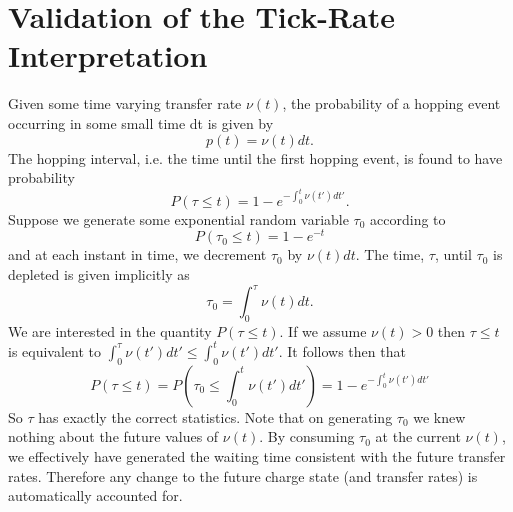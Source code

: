 \documentclass[11pt]{article}
\newcommand{\bibfile}{refs.bib}
\newcommand{\kt}{k_B T}
\begin{document}
\clearpage
\appendix

\section{Validation of the Tick-Rate Interpretation}
\label{app:tickrate}

Given some time varying transfer rate $\nu(t)$, the probability of a hopping event occurring in some small time dt is given by 
\begin{equation}
p(t) = \nu(t) dt.
\end{equation}
The hopping interval, i.e. the time until the first hopping event, is found to have probability
\begin{equation}
P(\tau \leq t) = 1-e^{-\int_0^t \nu(t')dt'}.
\end{equation}
Suppose we generate some exponential random variable $\tau_0$ according to
\begin{equation}
P(\tau_0 \leq t) = 1-e^{-t}
\end{equation}
and at each instant in time, we decrement $\tau_0$ by $\nu(t)dt$. The time, $\tau$, until $\tau_0$ is depleted is given implicitly as
\begin{equation}
\tau_0 = \int_0^\tau \nu(t) dt.
\end{equation}
We are interested in the quantity $P(\tau \leq t)$. If we assume $\nu(t)>0$ then $\tau \leq t$ is equivalent to $\int_0^\tau \nu(t') dt' \leq \int_0^t \nu(t')dt'$. It follows then that
\begin{equation}
P(\tau \leq t) = P\left( \tau_0 \leq \int_0^t \nu(t')dt' \right) = 1-e^{-\int_0^t \nu(t')dt'}
\end{equation}
So $\tau$ has exactly the correct statistics. Note that on generating $\tau_0$ we knew nothing about the future values of $\nu(t)$. By consuming $\tau_0$ at the current $\nu(t)$, we effectively have generated the waiting time consistent with the future transfer rates. Therefore any change to the future charge state (and transfer rates) is automatically accounted for.






\end{document}
